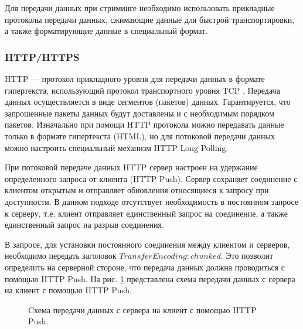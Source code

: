	\par Для передачи данных при стриминге необходимо использовать прикладные протоколы передачи данных,
	сжимающие данные для быстрой транспортировки, а также форматирующие данные в специальный формат.

	\subsubsection{HTTP/HTTPS}
		
	\par HTTP \cite{http} --- протокол прикладного уровня для передачи данных в формате гипертекста, 
	использующий протокол транспортного уровня TCP \cite{tcp}.
	Передача данных осуществляется в виде сегментов (пакетов) данных. 
	Гарантируется, что запрошенные пакеты данных будут доставлены и с необходимым порядком пакетов.
	Изначально при помощи HTTP протокола можно передавать данные только в формате гипертекста (HTML), 
	но для потоковой передачи данных можно настроить специальный механизм HTTP Long Polling.

	\par При потоковой передаче данных HTTP сервер настроен на удержание определенного запроса от клиента (HTTP Push). 
	Сервер сохраняет соединение с клиентом открытым и отправляет обновления относящиеся к запросу при доступности.
	В данном подходе отсутствует необходимость в постоянном запросе к серверу, 
	т.е. клиент отправляет единственный запрос на соединение, а также единственный запрос на разрыв соединения.

	В запросе, для установки постоянного соединения между клиентом и серверов, 
	необходимо передать заголовок $Transfer Encoding: chunked$. Это позволит определить на серверной стороне, 
	что передача данных должна проводиться с помощью HTTP Push.
	На рис. \ref{fig:http-push} представлена схема передачи данных с сервера на клиент с помощью HTTP Push.

	\begin{figure}[!h]
		\caption{Cхема передачи данных с сервера на клиент с помощью HTTP Push.}
		\label{fig:http-push}
	\end{figure}

